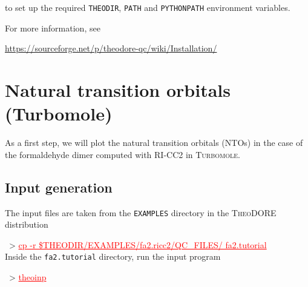 \documentclass[DIV=12,headings=normal]{scrartcl}
\newcommand{\redl}[1]{{\textcolor{red}{\underline{#1}}}}
\newcommand{\comm}[1]{
\small
~> \redl{#1}
\normalsize
}
\newcommand{\theo}{\textsc{TheoDORE}}
\begin{document}
to set up the required \texttt{THEODIR}, \texttt{PATH} and \texttt{PYTHONPATH} environment variables.

For more information, see

\url{https://sourceforge.net/p/theodore-qc/wiki/Installation/}

\clearpage
\section{Natural transition orbitals (Turbomole)}

As a first step, we will plot the natural transition orbitals (NTOs) in the case of the formaldehyde dimer computed with RI-CC2 in \textsc{Turbomole}.

\subsection{Input generation}
\label{sec:inpnto}

The input files are taken from the \texttt{EXAMPLES} directory in the \theo{} distribution

\comm{cp -r \$THEODIR/EXAMPLES/fa2.ricc2/QC\_FILES/ fa2.tutorial} \\

Inside the \texttt{fa2.tutorial} directory, run the input program

\comm{theoinp}
\end{document}
